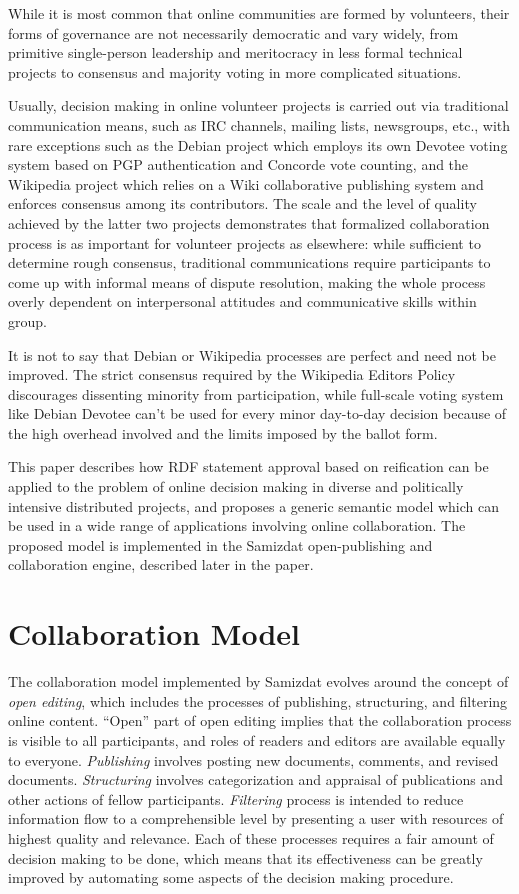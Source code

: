 \documentclass{llncs}
\begin{document}
While it is most common that online communities are formed by volunteers,
their forms of governance are not necessarily democratic and vary widely, from
primitive single-person leadership and meritocracy in less formal technical
projects to consensus and majority voting in more complicated situations.

Usually, decision making in online volunteer projects is carried out via
traditional communication means, such as IRC channels, mailing lists,
newsgroups, etc., with rare exceptions such as the Debian project which
employs its own Devotee voting system based on PGP authentication and Concorde
vote counting\cite{debian-constitution}, and the Wikipedia project which
relies on a Wiki collaborative publishing system and enforces consensus among
its contributors. The scale and the level of quality achieved by the latter
two projects demonstrates that formalized collaboration process is as
important for volunteer projects as elsewhere: while sufficient to determine
rough consensus, traditional communications require participants to come up
with informal means of dispute resolution, making the whole process overly
dependent on interpersonal attitudes and communicative skills within group.

It is not to say that Debian or Wikipedia processes are perfect and need not
be improved. The strict consensus required by the Wikipedia Editors Policy
discourages dissenting minority from participation, while full-scale voting
system like Debian Devotee can't be used for every minor day-to-day decision
because of the high overhead involved and the limits imposed by the ballot
form.

This paper describes how RDF statement approval based on reification can be
applied to the problem of online decision making in diverse and politically
intensive distributed projects, and proposes a generic semantic model which
can be used in a wide range of applications involving online collaboration.
The proposed model is implemented in the Samizdat open-publishing and
collaboration engine, described later in the paper.


\section{Collaboration Model}

The collaboration model implemented by Samizdat evolves around the concept of
\emph{open editing}\cite{opened}, which includes the processes of publishing,
structuring, and filtering online content. ``Open'' part of open editing
implies that the collaboration process is visible to all participants, and
roles of readers and editors are available equally to everyone.
\emph{Publishing} involves posting new documents, comments, and revised
documents. \emph{Structuring} involves categorization and appraisal of
publications and other actions of fellow participants. \emph{Filtering}
process is intended to reduce information flow to a comprehensible level by
presenting a user with resources of highest quality and relevance. Each of
these processes requires a fair amount of decision making to be done, which
means that its effectiveness can be greatly improved by automating some
aspects of the decision making procedure.
\end{document}
